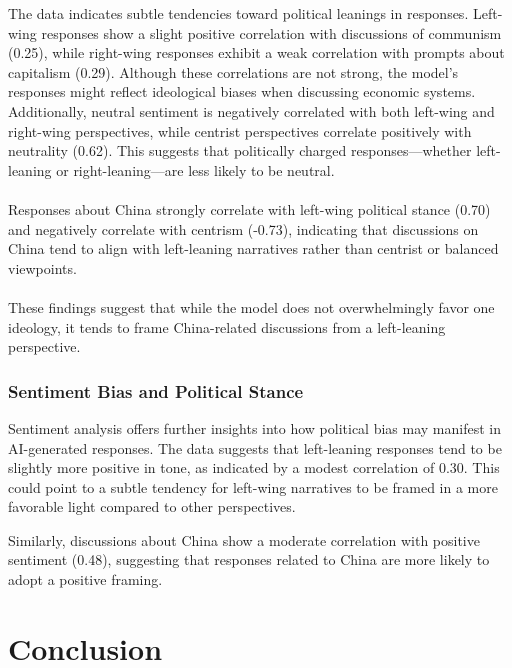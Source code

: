\documentclass[pdflatex,sn-mathphys-num]{sn-jnl}%
\theoremstyle{thmstyleone}%
\theoremstyle{thmstyletwo}%
\theoremstyle{thmstylethree}%
\begin{document}
The data indicates subtle tendencies toward political leanings in responses. Left-wing responses show a slight positive correlation with discussions of communism (0.25), while right-wing responses exhibit a weak correlation with prompts about capitalism (0.29). Although these correlations are not strong, the model’s responses might reflect ideological biases when discussing economic systems. Additionally, neutral sentiment is negatively correlated with both left-wing and right-wing perspectives, while centrist perspectives correlate positively with neutrality (0.62). This suggests that politically charged responses—whether left-leaning or right-leaning—are less likely to be neutral.
\\\\
Responses about China strongly correlate with left-wing political stance (0.70) and negatively correlate with centrism (-0.73), indicating that discussions on China tend to align with left-leaning narratives rather than centrist or balanced viewpoints.
\\\\
These findings suggest that while the model does not overwhelmingly favor one ideology, it tends to frame China-related discussions from a left-leaning perspective.

\subsubsection{Sentiment Bias and Political Stance}

Sentiment analysis offers further insights into how political bias may manifest in AI-generated responses. The data suggests that left-leaning responses tend to be slightly more positive in tone, as indicated by a modest correlation of 0.30. This could point to a subtle tendency for left-wing narratives to be framed in a more favorable light compared to other perspectives.

Similarly, discussions about China show a moderate correlation with positive sentiment (0.48), suggesting that responses related to China are more likely to adopt a positive framing.

\section{Conclusion}
\end{document}
